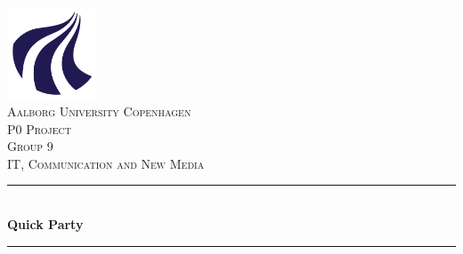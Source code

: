 \documentclass[12p]{article}
\begin{document}
\newcommand{\HRule}{\rule{\linewidth}{0.5mm}} %
\newcommand{\SlimHRule}{\rule{\linewidth}{0.25mm}} %


\begin{titlepage}
    
    \center
    
	
	\includegraphics[width=0.2\textwidth]{pics/AAU_Logo.png}\\[1cm]
    
	
	\textsc{\LARGE Aalborg University Copenhagen}\\[1.5cm]
	
	\textsc{\Large P0 Project}\\[0.5cm]
	
	\textsc{\large Group 9}\\[0.5cm]
	
	\textsc{\large IT, Communication and New Media}\\[0.5cm]
	
	
	
	\HRule\\[0.4cm]
	
	{\huge\bfseries Quick Party}\\[0.4cm]
	
	\HRule\\[1.5cm]
	
	

\end{titlepage}
\end{document}

